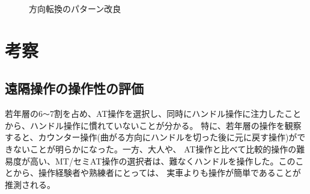 \begin{figure}[h]
  \begin{center}
  \caption{方向転換のパターン改良}
  \label{auto:result2_2}
  \end{center}
\end{figure}

\section{考察}
\subsection{遠隔操作の操作性の評価}
若年層の6\verb|～|7割を占め、AT操作を選択し、同時にハンドル操作に注力したことから、ハンドル操作に慣れていないことが分かる。
特に、若年層の操作を観察すると、カウンター操作(曲がる方向にハンドルを切った後に元に戻す操作)ができないことが明らかになった。一方、大人や、
AT操作と比べて比較的操作の難易度が高い、MT/セミAT操作の選択者は、難なくハンドルを操作した。このことから、操作経験者や熟練者にとっては、
実車よりも操作が簡単であることが推測される。

